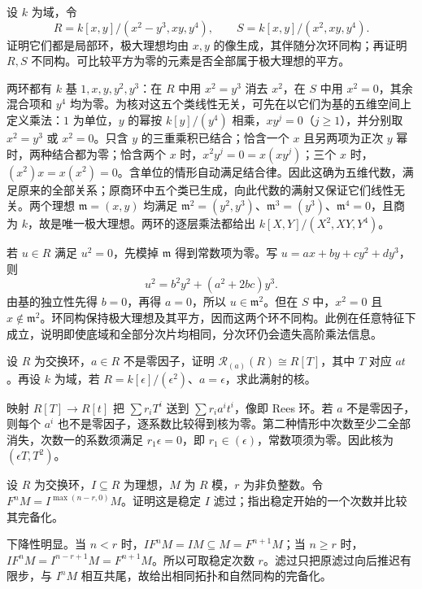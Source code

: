 \begin{exercise}\label{b3:ex:13-graded-not-ring}
	设 \(k\) 为域，令
	\[
		R=k[x,y]/(x^2-y^3,xy,y^4),\qquad S=k[x,y]/(x^2,xy,y^4).
	\]
	证明它们都是局部环，极大理想均由 \(x,y\) 的像生成，其伴随分次环同构；再证明 \(R,S\) 不同构。可比较平方为零的元素是否全部属于极大理想的平方。
\end{exercise}
\begin{solution}
	两环都有 \(k\) 基 \(1,x,y,y^2,y^3\)：在 \(R\) 中用 \(x^2=y^3\) 消去 \(x^2\)，在 \(S\) 中用 \(x^2=0\)，其余混合项和 \(y^4\) 均为零。为核对这五个类线性无关，可先在以它们为基的五维空间上定义乘法：\(1\) 为单位，\(y\) 的幂按 \(k[y]/(y^4)\) 相乘，\(xy^j=0\)（\(j\ge1\)），并分别取 \(x^2=y^3\) 或 \(x^2=0\)。只含 \(y\) 的三重乘积已结合；恰含一个 \(x\) 且另两项为正次 \(y\) 幂时，两种结合都为零；恰含两个 \(x\) 时，\(x^2y^j=0=x(xy^j)\)；三个 \(x\) 时，\((x^2)x=x(x^2)=0\)。含单位的情形自动满足结合律。因此这确为五维代数，满足原来的全部关系；原商环中五个类已生成，向此代数的满射又保证它们线性无关。两个理想 \(\mathfrak m=(x,y)\) 均满足 \(\mathfrak m^2=(y^2,y^3)\)、\(\mathfrak m^3=(y^3)\)、\(\mathfrak m^4=0\)，且商为 \(k\)，故是唯一极大理想。两环的逐层乘法都给出 \(k[X,Y]/(X^2,XY,Y^4)\)。

	若 \(u\in R\) 满足 \(u^2=0\)，先模掉 \(\mathfrak m\) 得到常数项为零。写 \(u=ax+by+cy^2+dy^3\)，则
	\[
		u^2=b^2y^2+(a^2+2bc)y^3.
	\]
	由基的独立性先得 \(b=0\)，再得 \(a=0\)，所以 \(u\in\mathfrak m^2\)。但在 \(S\) 中，\(x^2=0\) 且 \(x\notin\mathfrak m^2\)。环同构保持极大理想及其平方，因而这两个环不同构。此例在任意特征下成立，说明即使底域和全部分次片均相同，分次环仍会遗失高阶乘法信息。
\end{solution}

\begin{exercise}\label{b3:ex:13-principal-rees}
	设 \(R\) 为交换环，\(a\in R\) 不是零因子，证明 \(\mathcal R_{(a)}(R)\cong R[T]\)，其中 \(T\) 对应 \(at\)。再设 \(k\) 为域，若 \(R=k[\epsilon]/(\epsilon^2)\)、\(a=\epsilon\)，求此满射的核。
\end{exercise}
\begin{solution}
	映射 \(R[T]\rightarrow R[t]\) 把 \(\sum r_iT^i\) 送到 \(\sum r_ia^it^i\)，像即 Rees 环。若 \(a\) 不是零因子，则每个 \(a^i\) 也不是零因子，逐系数比较得到核为零。第二种情形中次数至少二全部消失，次数一的系数须满足 \(r_1\epsilon=0\)，即 \(r_1\in(\epsilon)\)，常数项须为零。因此核为 \((\epsilon T,T^2)\)。
\end{solution}

\begin{exercise}\label{b3:ex:13-shifted-filtration}
	设 \(R\) 为交换环，\(I\subseteq R\) 为理想，\(M\) 为 \(R\) 模，\(r\) 为非负整数。令 \(F^nM=I^{\max(n-r,0)}M\)。证明这是稳定 \(I\) 滤过；指出稳定开始的一个次数并比较其完备化。
\end{exercise}
\begin{solution}
	下降性明显。当 \(n<r\) 时，\(IF^nM=IM\subseteq M=F^{n+1}M\)；当 \(n\ge r\) 时，\(IF^nM=I^{n-r+1}M=F^{n+1}M\)。所以可取稳定次数 \(r\)。滤过只把原滤过向后推迟有限步，与 \(I^nM\) 相互共尾，故给出相同拓扑和自然同构的完备化。
\end{solution}

